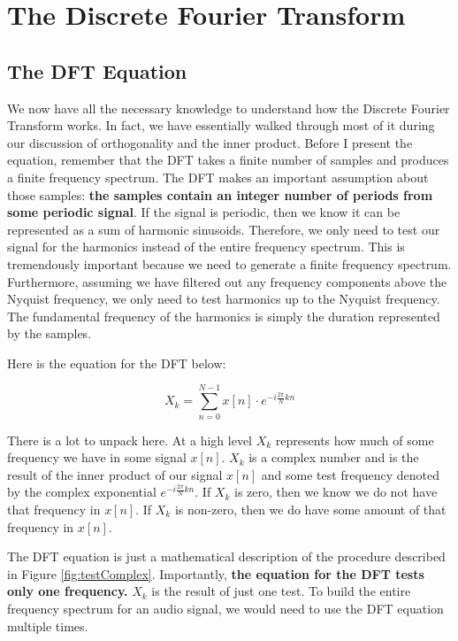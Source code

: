 \section*{The Discrete Fourier Transform}

\subsection*{The DFT Equation}

We now have all the necessary knowledge to understand how the Discrete Fourier Transform works.  In fact, we
have essentially walked through most of it during our discussion of orthogonality and the inner product.  Before
I present the equation, remember that the DFT takes a finite number of samples and produces a finite frequency
spectrum.  The DFT makes an important assumption about those samples: \textbf{the samples contain an integer number 
of periods from some periodic signal}.  If the signal is periodic, then we know it can be represented as a sum of
harmonic sinusoids.  Therefore, we only need to test our signal for the harmonics instead of the entire frequency
spectrum.  This is tremendously important because we need to generate a finite frequency spectrum.  Furthermore,
assuming we have filtered out any frequency components above the Nyquist frequency, we only need to test harmonics
up to the Nyquist frequency.  The fundamental frequency of the harmonics is simply the duration represented
by the samples.  


Here is the equation for the DFT below:

\begin{equation}
\label{eq:dft}
X_k = \sum_{n = 0}^{N - 1}x[n] \cdot e^{-i\frac{2\pi}{N}kn}
\end{equation}

There is a lot to unpack here.  At a high level $X_k$ represents how much of some frequency we have in
some signal $x[n]$.  $X_k$ is a complex number and is the result of the inner product of our signal $x[n]$
and some test frequency denoted by the complex exponential $e^{-i\frac{2\pi}{N}kn}$.  If $X_k$ is zero, then
we know we do not have that frequency in $x[n]$.  If $X_k$ is non-zero, then we do have some amount of 
that frequency in $x[n]$.  

The DFT equation is just a mathematical description of the procedure described 
in Figure \ref{fig:testComplex}.  Importantly, \textbf{the equation for the DFT tests only one frequency.}  
$X_k$ is the result of just one test.  To build the entire frequency spectrum for an audio signal, we would
need to use the DFT equation multiple times.


